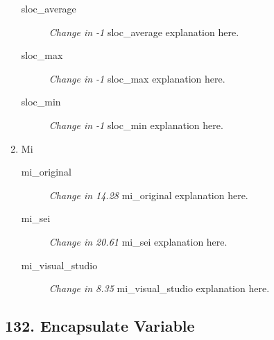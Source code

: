 \begin{enumerate}
\begin{description}
          \item [sloc\_average] \textit{Change in -1} sloc\_average explanation here.
          \item [sloc\_max] \textit{Change in -1} sloc\_max explanation here.
          \item [sloc\_min] \textit{Change in -1} sloc\_min explanation here.
        \end{description}
  \item Mi
        \begin{description}
          \item [mi\_original] \textit{Change in 14.28} mi\_original explanation here.
          \item [mi\_sei] \textit{Change in 20.61} mi\_sei explanation here.
          \item [mi\_visual\_studio] \textit{Change in 8.35} mi\_visual\_studio explanation here.
        \end{description}
\end{enumerate}
\subsection{ 132.  Encapsulate Variable }

